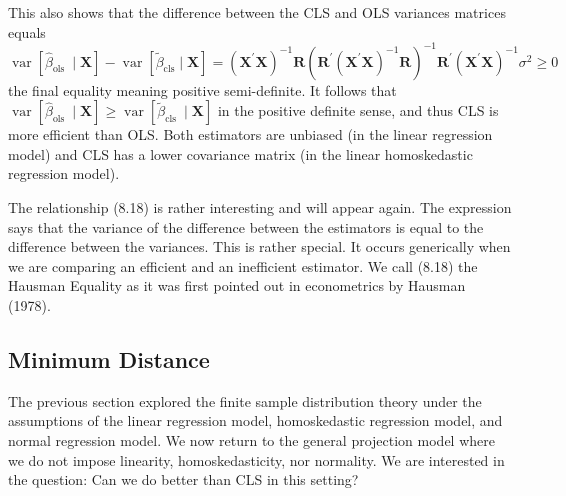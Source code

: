 \documentclass[10pt]{article}
\begin{document}
This also shows that the difference between the CLS and OLS variances matrices equals
$$
\operatorname{var}\left[\widehat{\beta}_{\text {ols }} \mid \boldsymbol{X}\right]-\operatorname{var}\left[\widetilde{\beta}_{\mathrm{cls}} \mid \boldsymbol{X}\right]=\left(\boldsymbol{X}^{\prime} \boldsymbol{X}\right)^{-1} \boldsymbol{R}\left(\boldsymbol{R}^{\prime}\left(\boldsymbol{X}^{\prime} \boldsymbol{X}\right)^{-1} \boldsymbol{R}\right)^{-1} \boldsymbol{R}^{\prime}\left(\boldsymbol{X}^{\prime} \boldsymbol{X}\right)^{-1} \sigma^{2} \geq 0
$$
the final equality meaning positive semi-definite. It follows that $\operatorname{var}\left[\widehat{\beta}_{\text {ols }} \mid \boldsymbol{X}\right] \geq \operatorname{var}\left[\widetilde{\beta}_{\text {cls }} \mid \boldsymbol{X}\right]$ in the positive definite sense, and thus CLS is more efficient than OLS. Both estimators are unbiased (in the linear regression model) and CLS has a lower covariance matrix (in the linear homoskedastic regression model).

The relationship (8.18) is rather interesting and will appear again. The expression says that the variance of the difference between the estimators is equal to the difference between the variances. This is rather special. It occurs generically when we are comparing an efficient and an inefficient estimator. We call (8.18) the Hausman Equality as it was first pointed out in econometrics by Hausman (1978).

\subsection{Minimum Distance}
The previous section explored the finite sample distribution theory under the assumptions of the linear regression model, homoskedastic regression model, and normal regression model. We now return to the general projection model where we do not impose linearity, homoskedasticity, nor normality. We are interested in the question: Can we do better than CLS in this setting?
\end{document}
